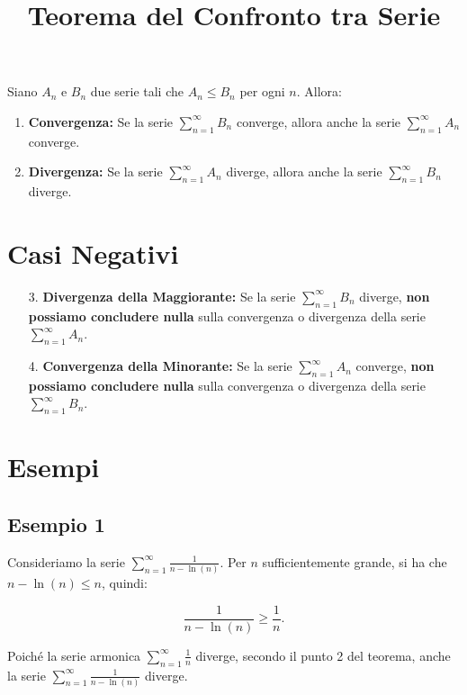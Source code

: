 \documentclass[12pt]{article} %
\begin{document}
\title{\textbf{Teorema del Confronto tra Serie}}
\author{}
\date{}
\maketitle

Siano $A_n$ e $B_n$ due serie tali che $A_n \leq B_n$ per ogni $n$. Allora:

\begin{enumerate}
    \item \textbf{Convergenza:} Se la serie $\sum_{n=1}^{\infty} B_n$ converge, allora anche la serie $\sum_{n=1}^{\infty} A_n$ converge.
    \item \textbf{Divergenza:} Se la serie $\sum_{n=1}^{\infty} A_n$ diverge, allora anche la serie $\sum_{n=1}^{\infty} B_n$ diverge.
\end{enumerate}

\section*{Casi Negativi}

\begin{enumerate}
    \item[3.] \textbf{Divergenza della Maggiorante:} Se la serie $\sum_{n=1}^{\infty} B_n$ diverge, \textbf{non possiamo concludere nulla} sulla convergenza o divergenza della serie $\sum_{n=1}^{\infty} A_n$.
    \item[4.] \textbf{Convergenza della Minorante:} Se la serie $\sum_{n=1}^{\infty} A_n$ converge, \textbf{non possiamo concludere nulla} sulla convergenza o divergenza della serie $\sum_{n=1}^{\infty} B_n$.
\end{enumerate}

\section*{Esempi}

\subsection*{Esempio 1}

Consideriamo la serie $\sum_{n=1}^{\infty} \frac{1}{n - \ln(n)}$. Per $n$ sufficientemente grande, si ha che $n - \ln(n) \leq n$, quindi:

\[
\frac{1}{n - \ln(n)} \geq \frac{1}{n}.
\]

Poiché la serie armonica $\sum_{n=1}^{\infty} \frac{1}{n}$ diverge, secondo il punto 2 del teorema, anche la serie $\sum_{n=1}^{\infty} \frac{1}{n - \ln(n)}$ diverge.
\end{document}
